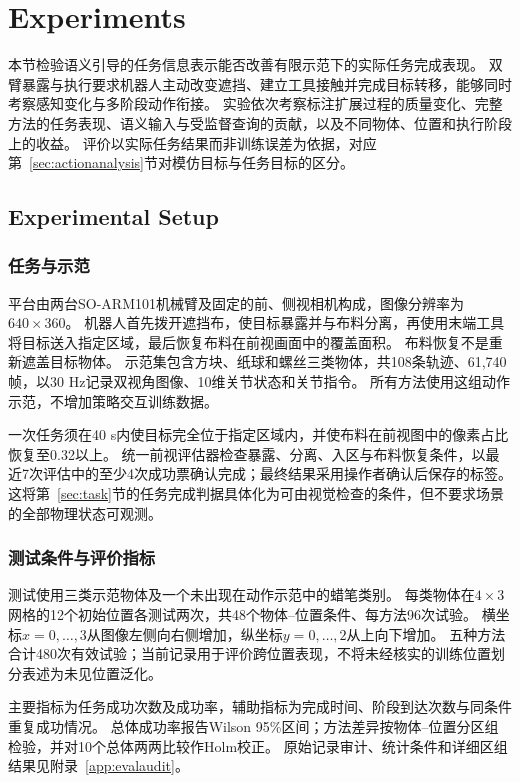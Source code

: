 \section{Experiments}
\label{sec:experiments}
本节检验语义引导的任务信息表示能否改善有限示范下的实际任务完成表现。
双臂暴露与执行要求机器人主动改变遮挡、建立工具接触并完成目标转移，能够同时考察感知变化与多阶段动作衔接。
实验依次考察标注扩展过程的质量变化、完整方法的任务表现、语义输入与受监督查询的贡献，以及不同物体、位置和执行阶段上的收益。
评价以实际任务结果而非训练误差为依据，对应第~\ref{sec:actionanalysis}节对模仿目标与任务目标的区分。

\subsection{Experimental Setup}
\label{sec:experimentalsetup}
\subsubsection{任务与示范}
平台由两台SO-ARM101机械臂及固定的前、侧视相机构成，图像分辨率为$640\times360$。
机器人首先拨开遮挡布，使目标暴露并与布料分离，再使用末端工具将目标送入指定区域，最后恢复布料在前视画面中的覆盖面积。
布料恢复不是重新遮盖目标物体。
示范集包含方块、纸球和螺丝三类物体，共108条轨迹、61,740帧，以30 Hz记录双视角图像、10维关节状态和关节指令。
所有方法使用这组动作示范，不增加策略交互训练数据。

一次任务须在40 s内使目标完全位于指定区域内，并使布料在前视图中的像素占比恢复至0.32以上。
统一前视评估器检查暴露、分离、入区与布料恢复条件，以最近7次评估中的至少4次成功票确认完成；最终结果采用操作者确认后保存的标签。
这将第~\ref{sec:task}节的任务完成判据具体化为可由视觉检查的条件，但不要求场景的全部物理状态可观测。

\subsubsection{测试条件与评价指标}
测试使用三类示范物体及一个未出现在动作示范中的蜡笔类别。
每类物体在$4\times3$网格的12个初始位置各测试两次，共48个物体--位置条件、每方法96次试验。
横坐标$x=0,\ldots,3$从图像左侧向右侧增加，纵坐标$y=0,\ldots,2$从上向下增加。
五种方法合计480次有效试验；当前记录用于评价跨位置表现，不将未经核实的训练位置划分表述为未见位置泛化。

主要指标为任务成功次数及成功率，辅助指标为完成时间、阶段到达次数与同条件重复成功情况。
总体成功率报告Wilson 95\%区间；方法差异按物体--位置分区组检验，并对10个总体两两比较作Holm校正。
原始记录审计、统计条件和详细区组结果见附录~\ref{app:evalaudit}。

